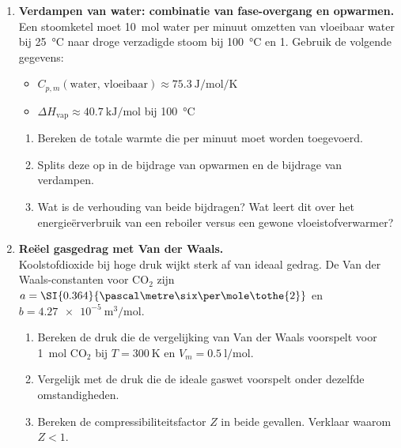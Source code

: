 \begin{enumerate}
\item \textbf{Verdampen van water: combinatie van fase-overgang en opwarmen.} \\
Een stoomketel moet \SI{10}{\mole} water per minuut omzetten van vloeibaar water bij \SI{25}{\celsius} naar droge verzadigde stoom bij \SI{100}{\celsius} en \SI{1}{\atm}. Gebruik de volgende gegevens:
\begin{itemize}
\item $C_{p,m}(\text{water, vloeibaar}) \approx \SI{75.3}{\joule\per\mole\per\kelvin}$
\item $\Delta H_{\text{vap}} \approx \SI{40.7}{\kilo\joule\per\mole}$ bij \SI{100}{\celsius}
\end{itemize}
\begin{enumerate}
\item[(a)] Bereken de totale warmte die per minuut moet worden toegevoerd.
\item[(b)] Splits deze op in de bijdrage van opwarmen en de bijdrage van verdampen.
\item[(c)] Wat is de verhouding van beide bijdragen? Wat leert dit over het energie\"erverbruik van een reboiler versus een gewone vloeistofverwarmer?
\end{enumerate}

\item \textbf{Reëel gasgedrag met Van der Waals.} \\
Koolstofdioxide bij hoge druk wijkt sterk af van ideaal gedrag. De Van der Waals-constanten voor $\mathrm{CO_2}$ zijn $a = \SI{0.364}{\pascal\metre\six\per\mole\tothe{2}}$ en $b = \SI{4.27e-5}{\metre\cubed\per\mole}$.
\begin{enumerate}
\item[(a)] Bereken de druk die de vergelijking van Van der Waals voorspelt voor \SI{1}{\mole} $\mathrm{CO_2}$ bij $T = \SI{300}{\kelvin}$ en $V_m = \SI{0.5}{\litre\per\mole}$.
\item[(b)] Vergelijk met de druk die de ideale gaswet voorspelt onder dezelfde omstandigheden.
\item[(c)] Bereken de compressibiliteitsfactor $Z$ in beide gevallen. Verklaar waarom $Z < 1$.
\end{enumerate}

\end{enumerate}


